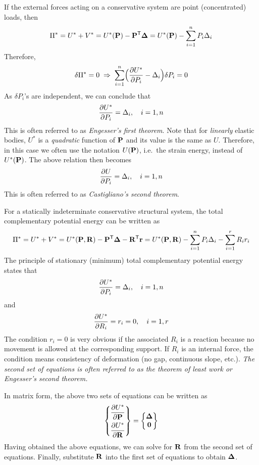 If the external forces acting on a conservative system are point (concentrated) loads, then
\begin{equation*}
  \Pi^* = U^* + V^* = U^*(\mathbf{P}) - \mathbf{P}^{\mathsf{T}}\bm{\Delta} = U^*(\mathbf{P}) - \sum_{i=1}^nP_i\Delta_i
\end{equation*}
Therefore,
\begin{equation*}
  \delta\Pi^* = 0 \;\Rightarrow\; \sum_{i=1}^n\Bigl(\frac{\partial U^*}{\partial P_i} - \Delta_i\Bigr)\delta P_i = 0
\end{equation*}
As $\delta P_i$'s are independent, we can conclude that
\begin{equation}
  \frac{\partial U^*}{\partial P_i} = \Delta_i,\quad i = 1, n
\end{equation}
This is often referred to as \emph{Engesser's first theorem}. Note that for \emph{linearly} elastic bodies, $U^*$ is a \emph{quadratic} function of $\mathbf{P}$ and its value is the same as $U$. Therefore, in this case we often use the notation $U(\mathbf{P})$, i.e.\ the strain energy, instead of $U^*(\mathbf{P})$. The above relation then becomes
\begin{equation}
  \frac{\partial U}{\partial P_i} = \Delta_i,\quad i = 1, n
\end{equation}
This is often referred to as \emph{Castigliano's second theorem}.

For a statically indeterminate conservative structural system, the total complementary potential energy can be written as
\begin{equation*}
  \Pi^* = U^* + V^* = U^*(\mathbf{P}, \mathbf{R}) - \mathbf{P}^{\mathsf{T}}\bm{\Delta} - \mathbf{R}^{\mathsf{T}}\mathbf{r} = U^*(\mathbf{P}, \mathbf{R}) - \sum_{i=1}^nP_i\Delta_i - \sum_{i=1}^rR_ir_i
\end{equation*}
The principle of stationary (minimum) total complementary potential energy states that
\begin{equation}
  \frac{\partial U^*}{\partial P_i} = \Delta_i,\quad i = 1, n
\end{equation}
and
\begin{equation}
  \frac{\partial U^*}{\partial R_i} = r_i = 0,\quad i = 1, r
\end{equation}
The condition $r_i = 0$ is very obvious if the associated $R_i$ is a reaction because no movement is allowed at the corresponding support. If $R_i$ is an internal force, the condition means consistency of deformation (no gap, continuous slope, etc.). \emph{The second set of equations is often referred to as the theorem of least work or Engesser's second theorem.}

In matrix form, the above two sets of equations can be written as
\begin{equation}
  \begin{Bmatrix}\dfrac{\partial U^*}{\partial\mathbf{P}}\\[8pt] \dfrac{\partial U^*}{\partial\mathbf{R}}\end{Bmatrix} = \begin{Bmatrix}\bm{\Delta}\\ \mathbf{0}\end{Bmatrix}
\end{equation}
Having obtained the above equations, we can solve for $\mathbf{R}$ from the second set of equations. Finally, substitute $\mathbf{R}$ into the first set of equations to obtain $\bm{\Delta}$.

